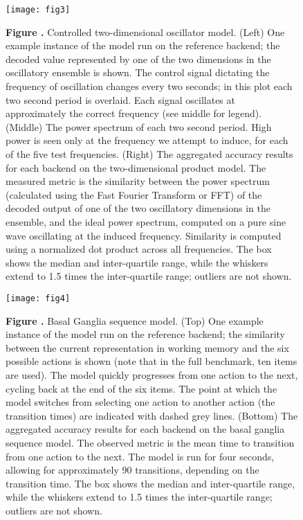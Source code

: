 \documentclass{frontiersSCNS}
\begin{document}


\begin{figure}[!ht]
\begin{center}
  \texttt{[image: fig3]}
\end{center}
\textbf{\label{fig:03} Figure .}
       {Controlled two-dimensional oscillator model. (Left) One example
         instance of the model run on the reference backend; the decoded
         value represented by one of the two dimensions in the oscillatory
         ensemble is shown. The control signal dictating the frequency of
         oscillation changes every two seconds; in this plot each two second
         period is overlaid. Each signal oscillates at approximately the
         correct frequency (see middle for legend).
         (Middle) The power spectrum of each two second period.
         High power is seen only at the frequency we attempt to induce,
         for each of the five test frequencies.
         (Right) The aggregated accuracy results for each backend on the
         two-dimensional product model. The measured metric is the similarity
         between the power spectrum (calculated using the Fast Fourier
         Transform or FFT) of the decoded output of one of the two oscillatory
         dimensions in the ensemble, and the ideal power spectrum,
         computed on a pure sine wave oscillating at the induced frequency.
         Similarity is computed using a normalized dot product across
         all frequencies. The box shows the median and
         inter-quartile range, while the whiskers extend to 1.5 times the
         inter-quartile range; outliers are not shown.}
\end{figure}

\begin{figure}[!ht]
\begin{center}
  \texttt{[image: fig4]}
\end{center}
\textbf{\label{fig:04} Figure .}
       {Basal Ganglia sequence model. (Top) One example instance
         of the model run on the reference backend; the similarity between
         the current representation in working memory and the six possible
         actions is shown (note that in the full benchmark, ten items are
         used). The model quickly progresses from one action to the next,
         cycling back at the end of the six items. The point at which the
         model switches from selecting one action to another action
         (the transition times) are indicated with dashed grey lines.
         (Bottom) The aggregated accuracy results for each backend on the
         basal ganglia sequence model. The observed metric is the mean
         time to transition from one action to the next. The model is run
         for four seconds, allowing for approximately 90 transitions, depending
         on the transition time. The box shows the median and
         inter-quartile range, while the whiskers extend to 1.5 times the
         inter-quartile range; outliers are not shown.}
\end{figure}
\end{document}
